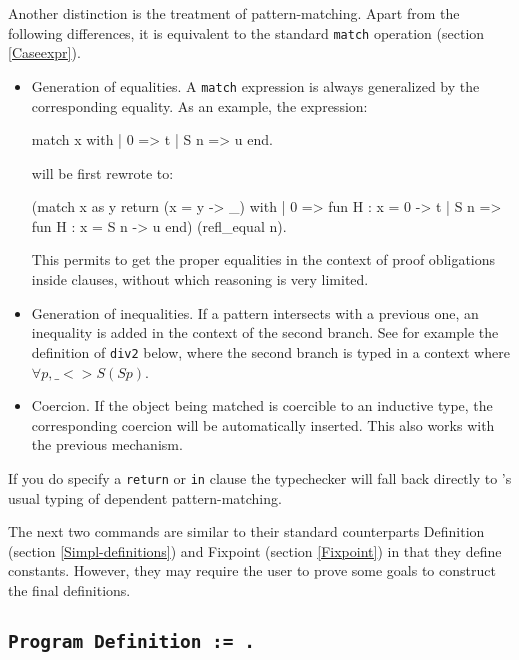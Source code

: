 Another distinction is the treatment of pattern-matching. Apart from the
following differences, it is equivalent to the standard {\tt match}
operation (section \ref{Caseexpr}).
\begin{itemize}
\item Generation of equalities. A {\tt match} expression is always
  generalized by the corresponding equality. As an example,
  the expression: 

\begin{coq_example*}
  match x with
  | 0 => t
  | S n => u
  end.
\end{coq_example*}
will be first rewrote to:
\begin{coq_example*}
  (match x as y return (x = y -> _) with
  | 0 => fun H : x = 0 -> t
  | S n => fun H : x = S n -> u
  end) (refl_equal n).
\end{coq_example*}
  
  This permits to get the proper equalities in the context of proof
  obligations inside clauses, without which reasoning is very limited.

\item Generation of inequalities. If a pattern intersects with a
  previous one, an inequality is added in the context of the second
  branch. See for example the definition of {\tt div2} below, where the second
  branch is typed in a context where $\forall p, \_ <> S (S p)$.
  
\item Coercion. If the object being matched is coercible to an inductive
  type, the corresponding coercion will be automatically inserted. This also
  works with the previous mechanism.
\end{itemize}

If you do specify a {\tt return} or {\tt in} clause the typechecker will
fall back directly to \Coq's usual typing of dependent pattern-matching.


The next two commands are similar to their standard counterparts
Definition (section \ref{Simpl-definitions}) and Fixpoint (section \ref{Fixpoint}) in that
they define constants. However, they may require the user to prove some
goals to construct the final definitions.

\subsection{\tt Program Definition {\ident} := {\term}.
  \label{ProgramDefinition}}

